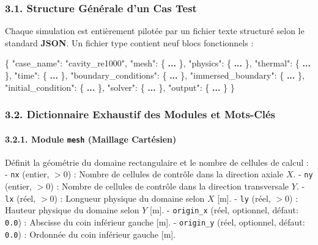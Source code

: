 \documentclass[
  french,
]{article}
\newenvironment{Shaded}{}{}
\newcommand{\DataTypeTok}[1]{\textcolor[rgb]{0.56,0.13,0.00}{#1}}
\newcommand{\ErrorTok}[1]{\textcolor[rgb]{1.00,0.00,0.00}{\textbf{#1}}}
\newcommand{\FunctionTok}[1]{\textcolor[rgb]{0.02,0.16,0.49}{#1}}
\newcommand{\StringTok}[1]{\textcolor[rgb]{0.25,0.44,0.63}{#1}}
\begin{document}
\subsubsection{3.1. Structure Générale d'un Cas
Test}\label{structure-guxe9nuxe9rale-dun-cas-test}

Chaque simulation est entièrement pilotée par un fichier texte structuré
selon le standard \textbf{JSON}. Un fichier type contient neuf blocs
fonctionnels :

\begin{Shaded}
\begin{Highlighting}[]
\FunctionTok{\{}
  \DataTypeTok{"case\_name"}\FunctionTok{:} \StringTok{"cavity\_re1000"}\FunctionTok{,}
  \DataTypeTok{"mesh"}\FunctionTok{:} \FunctionTok{\{} \ErrorTok{...} \FunctionTok{\},}
  \DataTypeTok{"physics"}\FunctionTok{:} \FunctionTok{\{} \ErrorTok{...} \FunctionTok{\},}
  \DataTypeTok{"thermal"}\FunctionTok{:} \FunctionTok{\{} \ErrorTok{...} \FunctionTok{\},}
  \DataTypeTok{"time"}\FunctionTok{:} \FunctionTok{\{} \ErrorTok{...} \FunctionTok{\},}
  \DataTypeTok{"boundary\_conditions"}\FunctionTok{:} \FunctionTok{\{} \ErrorTok{...} \FunctionTok{\},}
  \DataTypeTok{"immersed\_boundary"}\FunctionTok{:} \FunctionTok{\{} \ErrorTok{...} \FunctionTok{\},}
  \DataTypeTok{"initial\_condition"}\FunctionTok{:} \FunctionTok{\{} \ErrorTok{...} \FunctionTok{\},}
  \DataTypeTok{"solver"}\FunctionTok{:} \FunctionTok{\{} \ErrorTok{...} \FunctionTok{\},}
  \DataTypeTok{"output"}\FunctionTok{:} \FunctionTok{\{} \ErrorTok{...} \FunctionTok{\}}
\FunctionTok{\}}
\end{Highlighting}
\end{Shaded}

\subsubsection{3.2. Dictionnaire Exhaustif des Modules et
Mots-Clés}\label{dictionnaire-exhaustif-des-modules-et-mots-cluxe9s}

\paragraph{\texorpdfstring{3.2.1. Module \texttt{mesh} (Maillage
Cartésien)}{3.2.1. Module mesh (Maillage Cartésien)}}\label{module-mesh-maillage-cartuxe9sien}

Définit la géométrie du domaine rectangulaire et le nombre de cellules
de calcul : - \texttt{nx} (entier, \(>0\)) : Nombre de cellules de
contrôle dans la direction axiale \(X\). - \texttt{ny} (entier, \(>0\))
: Nombre de cellules de contrôle dans la direction transversale \(Y\). -
\texttt{lx} (réel, \(>0\)) : Longueur physique du domaine selon \(X\)
{[}m{]}. - \texttt{ly} (réel, \(>0\)) : Hauteur physique du domaine
selon \(Y\) {[}m{]}. - \texttt{origin\_x} (réel, optionnel, défaut:
\texttt{0.0}) : Abscisse du coin inférieur gauche {[}m{]}. -
\texttt{origin\_y} (réel, optionnel, défaut: \texttt{0.0}) : Ordonnée du
coin inférieur gauche {[}m{]}.
\end{document}
